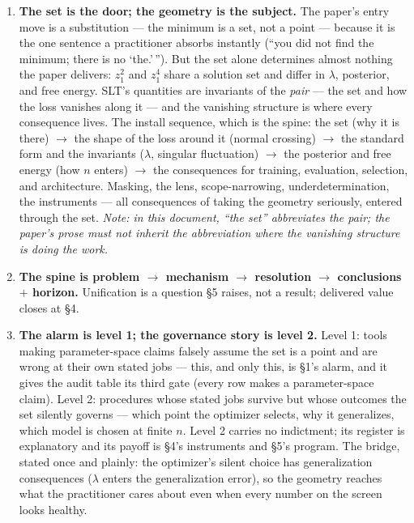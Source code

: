 \documentclass[11pt]{article}
\begin{document}
\begin{enumerate}[label=(\alph*), itemsep=6pt]

\item \textbf{The set is the door; the geometry is the subject.} The
paper's entry move is a substitution --- the minimum is a set, not a
point --- because it is the one sentence a practitioner absorbs
instantly (``you did not find the minimum; there is no `the.'\,'').
But the set alone determines almost nothing the paper delivers:
$z_1^2$ and $z_1^4$ share a solution set and differ in $\lambda$,
posterior, and free energy. SLT's quantities are invariants of the
\emph{pair} --- the set and how the loss vanishes along it --- and the
vanishing structure is where every consequence lives. The install
sequence, which is the spine: the set (why it is there) $\to$ the
shape of the loss around it (normal crossing) $\to$ the standard form
and the invariants ($\lambda$, singular fluctuation) $\to$ the
posterior and free energy (how $n$ enters) $\to$ the consequences for
training, evaluation, selection, and architecture. Masking, the lens,
scope-narrowing, underdetermination, the instruments --- all
consequences of taking the geometry seriously, entered through the
set. \emph{Note: in this document, ``the set'' abbreviates the pair;
the paper's prose must not inherit the abbreviation where the
vanishing structure is doing the work.}

\item \textbf{The spine is problem $\to$ mechanism $\to$ resolution
$\to$ conclusions $+$ horizon.} Unification is a question \S5 raises,
not a result; delivered value closes at \S4.

\item \textbf{The alarm is level 1; the governance story is level 2.}
Level 1: tools making parameter-space claims falsely assume the set is a
point and are wrong at their own stated jobs --- this, and only this, is
\S1's alarm, and it gives the audit table its third gate (every row
makes a parameter-space claim). Level 2: procedures whose stated jobs
survive but whose outcomes the set silently governs --- which point the
optimizer selects, why it generalizes, which model is chosen at finite
$n$. Level 2 carries no indictment; its register is explanatory and its
payoff is \S4's instruments and \S5's program. The bridge, stated once
and plainly: the optimizer's silent choice has generalization
consequences ($\lambda$ enters the generalization error), so the
geometry reaches what the practitioner cares about even when every
number on the screen looks healthy.


\end{enumerate}
\end{document}

